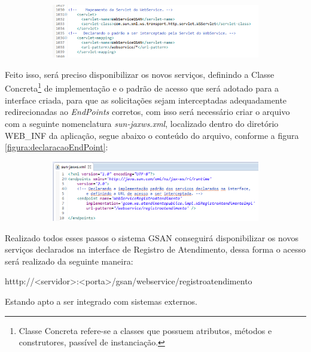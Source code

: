 \begin{figure}[H]
	\centering
	\caption{Declaração da servlet do Webservice.}	
	\label{figura:declaracaoServlet}
	\begin{subfigure}[H]{\textwidth}
		\centering
		\includegraphics{figuras/declarando_servlet.png}
	\end{subfigure}
\end{figure}

Feito isso, será preciso disponibilizar os novos serviços, definindo a Classe Concreta\footnote{Classe Concreta refere-se a classes que possuem atributos, métodos e construtores, passível de instanciação.} de implementação e o padrão de acesso que será adotado para a interface criada, para que as solicitações sejam interceptadas adequadamente redirecionadas ao \textit{EndPoints} corretos, com isso será necessário criar o arquivo com a seguinte nomenclatura \textit{sun-jaxws.xml}, localizado dentro do diretório WEB\_INF da aplicação, segue abaixo o conteúdo do arquivo, conforme a figura \ref{figura:declaracaoEndPoint}:

\begin{figure}[H]
	\centering
	\caption{Declaração do \textit{EndPoint} dos serviços.}	
	\label{figura:declaracaoEndPoint}
	\begin{subfigure}[H]{\textwidth}
		\centering
		\includegraphics{figuras/declaracao_endpoint.png}
	\end{subfigure}
\end{figure}


Realizado todos esses passos o sistema GSAN conseguirá disponibilizar os novos serviços declarados na interface de Registro de Atendimento, dessa forma o acesso será realizado da seguinte maneira:

\begin{description}
	\item htttp://<servidor>:<porta>/gsan/webservice/registroatendimento
\end{description}

Estando apto a ser integrado com sistemas externos. 
